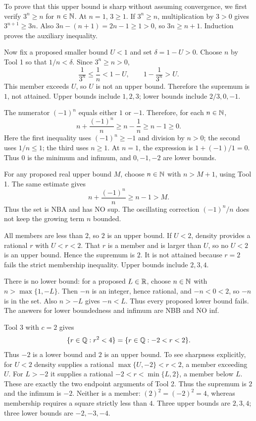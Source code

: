 To prove that this upper bound is sharp without assuming convergence,
we first verify $3^n\geq n$ for $n\in\mathbb{N}$. At $n=1$, $3\geq1$.
If $3^n\geq n$, multiplication by $3>0$ gives
$3^{n+1}\geq3n$. Also
$3n-(n+1)=2n-1\geq1>0$, so $3n\geq n+1$.
Induction proves the auxiliary inequality.

Now fix a proposed smaller bound $U<1$ and set $\delta=1-U>0$.
Choose $n$ by Tool 1 so that $1/n<\delta$. Since $3^n\geq n>0$,
\[
 \frac1{3^n}\leq\frac1n<1-U,
 \qquad
 1-\frac1{3^n}>U.
\]
This member exceeds $U$, so $U$ is not an upper bound. Therefore
the supremum is $1$, not attained. Upper bounds include $1,2,3$;
lower bounds include $2/3,0,-1$.

\label{bounds:k}
The numerator $(-1)^n$ equals either $1$ or $-1$. Therefore,
for each $n\in\mathbb{N}$,
\[
 n+\frac{(-1)^n}{n}
 \geq n-\frac1n
 \geq n-1
 \geq0.
\]
Here the first inequality uses $(-1)^n\geq-1$ and division by
$n>0$; the second uses $1/n\leq1$; the third uses $n\geq1$.
At $n=1$, the expression is $1+(-1)/1=0$. Thus $0$ is the
minimum and infimum, and $0,-1,-2$ are lower bounds.

For any proposed real upper bound $M$, choose $n\in\mathbb{N}$ with
$n>M+1$, using Tool 1. The same estimate gives
\[
 n+\frac{(-1)^n}{n}\geq n-1>M.
\]
Thus the set is NBA and has NO sup. The oscillating correction
$(-1)^n/n$ does not keep the growing term $n$ bounded.

\label{bounds:l}
All members are less than $2$, so $2$ is an upper bound. If $U<2$,
density provides a rational $r$ with $U<r<2$. That $r$ is a member
and is larger than $U$, so no $U<2$ is an upper bound. Hence the
supremum is $2$. It is not attained because $r=2$ fails the strict
membership inequality. Upper bounds include $2,3,4$.

There is no lower bound: for a proposed $L\in\mathbb{R}$, choose
$n\in\mathbb{N}$ with $n>\max\{1,-L\}$. Then $-n$ is an integer,
hence rational, and $-n<0<2$, so $-n$ is in the set. Also
$n>-L$ gives $-n<L$. Thus every proposed lower bound fails.
The answers for lower boundedness and infimum are NBB and NO inf.

\label{bounds:m}
Tool 3 with $c=2$ gives
\[
 \{r\in\mathbb{Q}:r^2<4\}=\{r\in\mathbb{Q}:-2<r<2\}.
\]
Thus $-2$ is a lower bound and $2$ is an upper bound. To see
sharpness explicitly, for $U<2$ density supplies a rational
$\max\{U,-2\}<r<2$, a member exceeding $U$. For $L>-2$ it
supplies a rational $-2<r<\min\{L,2\}$, a member below $L$.
These are exactly the two endpoint arguments of Tool 2. Thus
the supremum is $2$ and the infimum is $-2$.
Neither is a member: $(2)^2=(-2)^2=4$, whereas membership requires
a square strictly less than $4$. Three upper bounds are $2,3,4$;
three lower bounds are $-2,-3,-4$.

